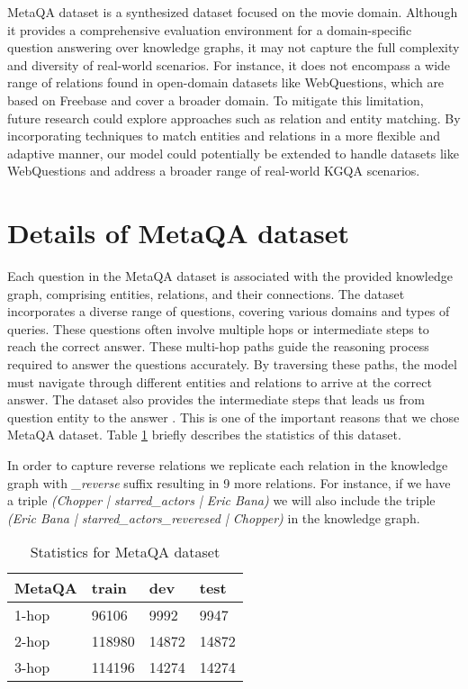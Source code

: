 \documentclass[11pt]{article}
\begin{document}
 MetaQA dataset is a synthesized dataset focused on the movie domain. Although it provides a comprehensive evaluation environment for a domain-specific question answering over knowledge graphs, it may not capture the full complexity and diversity of real-world scenarios. For instance, it does not encompass a wide range of relations found in open-domain datasets like WebQuestions, which are based on Freebase and cover a broader domain. To mitigate this limitation, future research could explore approaches such as relation and entity matching. By incorporating techniques to match entities and relations in a more flexible and adaptive manner, our model could potentially be extended to handle datasets like WebQuestions and address a broader range of real-world KGQA scenarios.




\appendix

\section{Details of MetaQA dataset}
\label{ap:metaqa}

Each question in the MetaQA dataset is associated with the provided knowledge graph, comprising entities, relations, and their connections. The dataset incorporates a diverse range of questions, covering various domains and types of queries. These questions often involve multiple hops or intermediate steps to reach the correct answer. These multi-hop paths guide the reasoning process required to answer the questions accurately. By traversing these paths, the model must navigate through different entities and relations to arrive at the correct answer. The dataset also provides the intermediate steps that leads us from question entity to the answer . This is one of the important reasons that we chose MetaQA dataset. Table \ref{tab:metaqastats} briefly describes the statistics of this dataset.

In order to capture reverse relations we replicate each relation in the knowledge graph with \emph{\_reverse} suffix resulting in 9 more relations. For instance, if we have a triple \emph{(Chopper | starred\_actors | Eric Bana)} we will also include the triple \emph{(Eric Bana | starred\_actors\_reveresed | Chopper)} in the knowledge graph.

\begin{table}
\centering
\begin{tabular}{l|l l l}
\hline
\textbf{MetaQA} & \textbf{train} & \textbf{dev} & \textbf{test}\\
\hline
1-hop & 96106 & 9992 & 9947 \\
2-hop & 118980 & 14872 & 14872 \\
3-hop & 114196 & 14274 & 14274 \\
\hline
\end{tabular}

\caption{Statistics for MetaQA dataset}
\label{tab:metaqastats}
\end{table}
\end{document}
